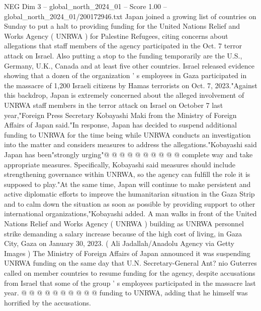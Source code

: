 \begin{textsample}{NEG Dim 3 – global\_north\_2024\_01 – Score 1.00 – global\_north\_2024\_01/200172946.txt}  \label{ex:f3_neg_238}
Japan joined a growing list of countries on Sunday to put a halt to providing funding for the United Nations Relief and Works Agency ( UNRWA ) for Palestine Refugees, citing concerns about allegations that staff members of the agency participated in the Oct. 7 terror attack on Israel.
Also putting a stop to the funding temporarily are the U.S., Germany, U.K., Canada and at least five other countries.
Israel released evidence showing that a dozen of the organization ' s employees in Gaza participated in the massacre of 1,200 Israeli citizens by Hamas terrorists on Oct. 7, 2023."Against this backdrop, Japan is extremely concerned about the alleged involvement of UNRWA staff members in the terror attack on Israel on October 7 last year,"Foreign Press Secretary Kobayashi Maki from the Ministry of Foreign Affairs of Japan said."In response, Japan has decided to suspend additional funding to UNRWA for the time being while UNRWA conducts an investigation into the matter and considers measures to address the allegations."Kobayashi said Japan has been"strongly urging"@ @ @ @ @ @ @ @ @ @ complete way and take appropriate measures.
Specifically, Kobayashi said measures should include strengthening governance within UNRWA, so the agency can fulfill the role it is supposed to play."At the same time, Japan will continue to make persistent and active diplomatic efforts to improve the humanitarian situation in the Gaza Strip and to calm down the situation as soon as possible by providing support to other international organizations,"Kobayashi added.
A man walks in front of the United Nations Relief and Works Agency ( UNRWA ) building as UNRWA personnel strike demanding a salary increase because of the high cost of living, in Gaza City, Gaza on January 30, 2023. ( Ali Jadallah/Anadolu Agency via Getty Images ) The Ministry of Foreign Affairs of Japan announced it was suspending UNRWA funding on the same day that U.N.
Secretary-General Ant? nio Guterres called on member countries to resume funding for the agency, despite accusations from Israel that some of the group ' s employees participated in the massacre last year. @ @ @ @ @ @ @ @ @ @ funding to UNRWA, adding that he himself was horrified by the accusations.

\end{textsample}
